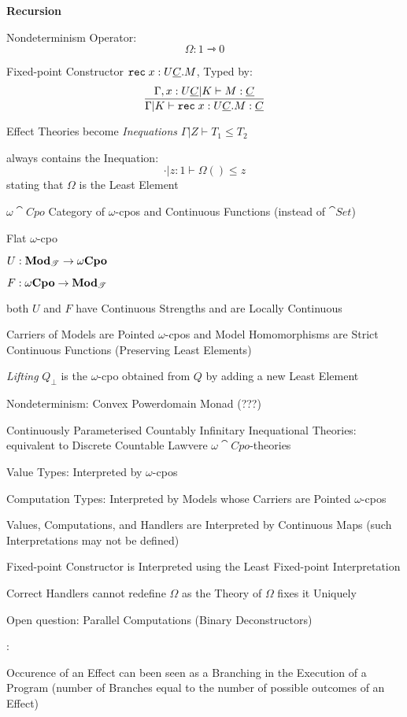 \textbf{Recursion}

Nondeterminism Operator:
\[
  \Omega : 1 \rightarrowtriangle 0
\]

Fixed-point Constructor $\mathtt{rec}\; x : U \underline{C}.M$, Typed
by:
\[
  \frac{\Gamma,x:U \underline{C} | K \vdash M : \underline{C}}
  {\Gamma | K \vdash \mathtt{rec}\; x : U \underline{C}.M : \underline{C}}
\]

Effect Theories become \emph{Inequations} $\Gamma | Z \vdash T_1 \leq
T_2$

always contains the Inequation:
\[
  \cdot | z:1 \vdash \Omega() \leq z
\]
stating that $\Omega$ is the Least Element

$\omega\cat{Cpo}$ Category of $\omega$-cpos and Continuous Functions
(instead of $\cat{Set}$)

Flat $\omega$-cpo

$U : \mathbf{Mod}_\mathscr{T} \rightarrow \omega \mathbf{Cpo}$

$F : \omega\mathbf{Cpo} \rightarrow \mathbf{Mod}_\mathscr{T}$

both $U$ and $F$ have Continuous Strengths and are Locally Continuous

Carriers of Models are Pointed $\omega$-cpos and Model Homomorphisms
are Strict Continuous Functions (Preserving Least Elements)

\emph{Lifting} $Q_\bot$ is the $\omega$-cpo obtained from $Q$ by
adding a new Least Element %

Nondeterminism: Convex Powerdomain Monad (???)

Continuously Parameterised Countably Infinitary Inequational Theories:
equivalent to Discrete Countable Lawvere $\omega\cat{Cpo}$-theories

Value Types: Interpreted by $\omega$-cpos

Computation Types: Interpreted by Models whose Carriers are Pointed
$\omega$-cpos

Values, Computations, and Handlers are Interpreted by Continuous Maps
(such Interpretations may not be defined)

Fixed-point Constructor is Interpreted using the Least Fixed-point
Interpretation %

Correct Handlers cannot redefine $\Omega$ as the Theory of $\Omega$
fixes it Uniquely

Open question: Parallel Computations (Binary Deconstructors)



\cite{pretnar15}:

Occurence of an Effect can been seen as a Branching in the Execution
of a Program (number of Branches equal to the number of possible
outcomes of an Effect)

